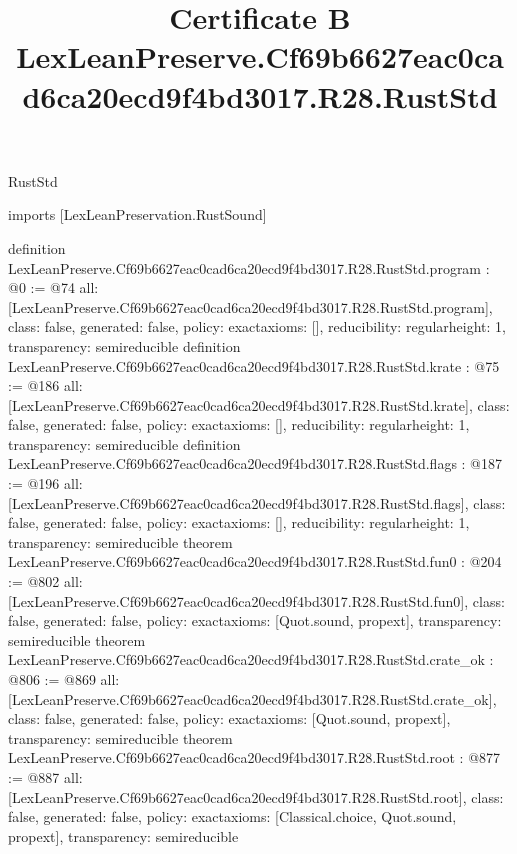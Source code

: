 \begin{lexlean}{RustStd}
\title{Certificate B LexLeanPreserve.Cf69b6627eac0cad6ca20ecd9f4bd3017.R28.RustStd}
\begin{coremodule}
imports [LexLeanPreservation.RustSound]

definition LexLeanPreserve.Cf69b6627eac0cad6ca20ecd9f4bd3017.R28.RustStd.program : @0 := @74 {
  all: [LexLeanPreserve.Cf69b6627eac0cad6ca20ecd9f4bd3017.R28.RustStd.program],
  class: false,
  generated: false,
  policy: exact{axioms: []},
  reducibility: regular{height: 1},
  transparency: semireducible
}
definition LexLeanPreserve.Cf69b6627eac0cad6ca20ecd9f4bd3017.R28.RustStd.krate : @75 := @186 {
  all: [LexLeanPreserve.Cf69b6627eac0cad6ca20ecd9f4bd3017.R28.RustStd.krate],
  class: false,
  generated: false,
  policy: exact{axioms: []},
  reducibility: regular{height: 1},
  transparency: semireducible
}
definition LexLeanPreserve.Cf69b6627eac0cad6ca20ecd9f4bd3017.R28.RustStd.flags : @187 := @196 {
  all: [LexLeanPreserve.Cf69b6627eac0cad6ca20ecd9f4bd3017.R28.RustStd.flags],
  class: false,
  generated: false,
  policy: exact{axioms: []},
  reducibility: regular{height: 1},
  transparency: semireducible
}
theorem LexLeanPreserve.Cf69b6627eac0cad6ca20ecd9f4bd3017.R28.RustStd.fun0 : @204 := @802 {
  all: [LexLeanPreserve.Cf69b6627eac0cad6ca20ecd9f4bd3017.R28.RustStd.fun0],
  class: false,
  generated: false,
  policy: exact{axioms: [Quot.sound, propext]},
  transparency: semireducible
}
theorem LexLeanPreserve.Cf69b6627eac0cad6ca20ecd9f4bd3017.R28.RustStd.crate_ok : @806 := @869 {
  all: [LexLeanPreserve.Cf69b6627eac0cad6ca20ecd9f4bd3017.R28.RustStd.crate_ok],
  class: false,
  generated: false,
  policy: exact{axioms: [Quot.sound, propext]},
  transparency: semireducible
}
theorem LexLeanPreserve.Cf69b6627eac0cad6ca20ecd9f4bd3017.R28.RustStd.root : @877 := @887 {
  all: [LexLeanPreserve.Cf69b6627eac0cad6ca20ecd9f4bd3017.R28.RustStd.root],
  class: false,
  generated: false,
  policy: exact{axioms: [Classical.choice, Quot.sound, propext]},
  transparency: semireducible
}


\end{coremodule}
\end{lexlean}
